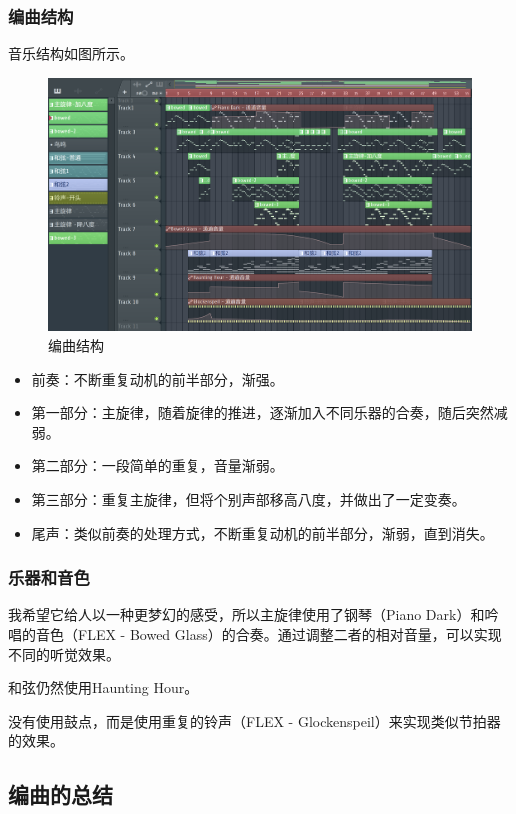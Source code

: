 \documentclass[a4paper,12pt]{article} %
\begin{document}
\subsubsection{编曲结构}
音乐结构如图所示。
\begin{figure}[H]
    \centering
    \includegraphics[width=1.0\linewidth]{images/Pink-flstudio.png}
    \caption{编曲结构}
    \label{fig:enter-label}
\end{figure}
\begin{itemize}
    \item 前奏：不断重复动机的前半部分，渐强。
    \item 第一部分：主旋律，随着旋律的推进，逐渐加入不同乐器的合奏，随后突然减弱。
    \item 第二部分：一段简单的重复，音量渐弱。
    \item 第三部分：重复主旋律，但将个别声部移高八度，并做出了一定变奏。
    \item 尾声：类似前奏的处理方式，不断重复动机的前半部分，渐弱，直到消失。
\end{itemize}


\subsubsection{乐器和音色}
我希望它给人以一种更梦幻的感受，所以主旋律使用了钢琴（Piano Dark）和吟唱的音色（FLEX - Bowed Glass）的合奏。通过调整二者的相对音量，可以实现不同的听觉效果。

和弦仍然使用Haunting Hour。

没有使用鼓点，而是使用重复的铃声（FLEX - Glockenspeil）来实现类似节拍器的效果。

\subsection{编曲的总结}
\end{document}
